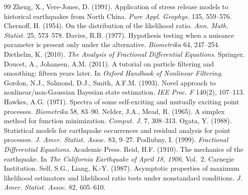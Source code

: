 \documentclass[11pt,a4paper]{article}
\begin{document}
\begin{thebibliography}{99}
 Zheng, X., Vere-Jones, D. (1991). Application of stress release models to historical earthquakes from North China. \emph{Pure Appl. Geophys.} 135, 559--576.
 Chernoff, H. (1954). On the distribution of the likelihood ratio. \emph{Ann. Math. Statist.} 25, 573--578.
 Davies, R.B. (1977). Hypothesis testing when a nuisance parameter is present only under the alternative. \emph{Biometrika} 64, 247--254.
 Diethelm, K. (2010). \emph{The Analysis of Fractional Differential Equations}. Springer.
 Doucet, A., Johansen, A.M. (2011). A tutorial on particle filtering and smoothing: fifteen years later. In \emph{Oxford Handbook of Nonlinear Filtering}.
 Gordon, N.J., Salmond, D.J., Smith, A.F.M. (1993). Novel approach to nonlinear/non-Gaussian Bayesian state estimation. \emph{IEE Proc. F} 140(2), 107--113.
 Hawkes, A.G. (1971). Spectra of some self-exciting and mutually exciting point processes. \emph{Biometrika} 58, 83--90.
 Nelder, J.A., Mead, R. (1965). A simplex method for function minimization. \emph{Comput. J.} 7, 308--313.
 Ogata, Y. (1988). Statistical models for earthquake occurrences and residual analysis for point processes. \emph{J. Amer. Statist. Assoc.} 83, 9--27.
 Podlubny, I. (1999). \emph{Fractional Differential Equations}. Academic Press.
 Reid, H.F. (1910). The mechanics of the earthquake. In \emph{The California Earthquake of April 18, 1906}, Vol.~2. Carnegie Institution.
 Self, S.G., Liang, K.-Y. (1987). Asymptotic properties of maximum likelihood estimators and likelihood ratio tests under nonstandard conditions. \emph{J. Amer. Statist. Assoc.} 82, 605--610.
\end{thebibliography}
\end{document}
